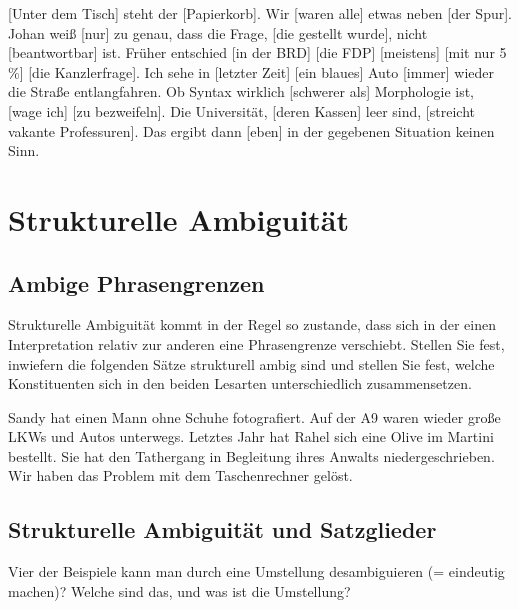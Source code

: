 \documentclass[12pt,a4paper,twoside]{article}
\begin{document}
\begin{exe}
  \ex{} [Unter dem Tisch] steht der [Papierkorb].
  \ex{} Wir [waren alle] etwas neben [der Spur].
  \ex{} Johan weiß [nur] zu genau, dass die Frage, [die gestellt wurde], nicht [beantwortbar] ist.
  \ex{} Früher entschied [in der BRD] [die FDP] [meistens] [mit nur 5 \%] [die Kanzlerfrage]. 
  \ex{} Ich sehe in [letzter Zeit] [ein blaues] Auto [immer] wieder die Straße entlangfahren.
  \ex{} Ob Syntax wirklich [schwerer als] Morphologie ist, [wage ich] [zu bezweifeln].
  \ex{} Die Universität, [deren Kassen] leer sind, [streicht vakante Professuren].
  \ex{} Das ergibt dann [eben] in der gegebenen Situation keinen Sinn.
\end{exe}


\section{Strukturelle Ambiguität}

\subsection{Ambige Phrasengrenzen}

Strukturelle Ambiguität kommt in der Regel so zustande, dass sich in der einen Interpretation relativ zur anderen eine Phrasengrenze verschiebt.
Stellen Sie fest, inwiefern die folgenden Sätze strukturell ambig sind und stellen Sie fest, welche Konstituenten sich in den beiden Lesarten unterschiedlich zusammensetzen.

\begin{exe}
  \ex Sandy hat einen Mann ohne Schuhe fotografiert.
  \ex Auf der A9 waren wieder große LKWs und Autos unterwegs.
  \ex Letztes Jahr hat Rahel sich eine Olive im Martini bestellt.
  \ex Sie hat den Tathergang in Begleitung ihres Anwalts niedergeschrieben.
  \ex Wir haben das Problem mit dem Taschenrechner gelöst.
\end{exe}

\subsection{Strukturelle Ambiguität und Satzglieder}

Vier der Beispiele kann man durch eine Umstellung desambiguieren (= eindeutig machen)?
Welche sind das, und was ist die Umstellung?

\newpage
\hspace{1em}
\newpage
\hspace{1em}
\end{document}
